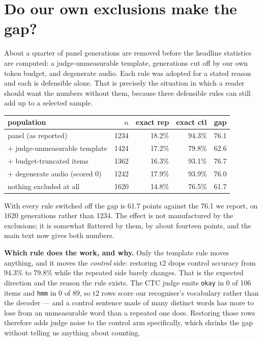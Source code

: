 \documentclass[11pt]{article}
\begin{document}
\section{Do our own exclusions make the gap?}

About a quarter of panel generations are removed before the headline statistics
are computed: a judge-unmeasurable template, generations cut off by our own token
budget, and degenerate audio. Each rule was adopted for a stated reason and each
is defensible alone. That is precisely the situation in which a reader should
want the numbers without them, because three defensible rules can still add up to
a selected sample.

\begin{center}
\begin{tabular}{lrrrr}
\toprule
population & $n$ & exact rep & exact ctl & gap \\
\midrule
panel (as reported)   & 1234 & 18.2\% & 94.3\% & 76.1 \\
$+$ judge-unmeasurable template & 1424 & 17.2\% & 79.8\% & 62.6 \\
$+$ budget-truncated items & 1362 & 16.3\% & 93.1\% & 76.7 \\
$+$ degenerate audio (scored 0) & 1242 & 17.9\% & 93.9\% & 76.0 \\
nothing excluded at all & 1620 & 14.8\% & 76.5\% & 61.7 \\
\bottomrule
\end{tabular}
\end{center}

\noindent With every rule switched off the gap is 61.7 points against the 76.1
we report, on 1620 generations rather than 1234. The effect is not manufactured
by the exclusions; it is somewhat flattered by them, by about fourteen points,
and the main text now gives both numbers.

\noindent\textbf{Which rule does the work, and why.} Only the template rule moves
anything, and it moves the \emph{control} side: restoring t2 drops control
accuracy from 94.3\% to 79.8\% while the repeated side barely changes. That is
the expected direction and the reason the rule exists. The CTC judge emits
\texttt{okay} in 0 of 106 items and \texttt{hmm} in 0 of 89, so t2 rows score our
recogniser's vocabulary rather than the decoder --- and a control sentence made
of many distinct words has more to lose from an unmeasurable word than a repeated
one does. Restoring those rows therefore adds judge noise to the control arm
specifically, which shrinks the gap without telling us anything about counting.
\end{document}
